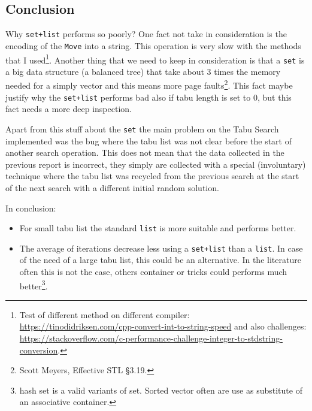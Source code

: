 \subsection{Conclusion}
	Why \verb|set+list| performs so poorly? One fact not take in consideration is the encoding of the \verb|Move| into a string. This operation is very slow with the methods that I used\footnote{Test of different method on different compiler: \\ \href{https://tinodidriksen.com/2010/02/cpp-convert-int-to-string-speed/}{https://tinodidriksen.com/cpp-convert-int-to-string-speed} and also challenges: \\ \href{https://stackoverflow.com/questions/4351371/c-performance-challenge-integer-to-stdstring-conversion}{https://stackoverflow.com/c-performance-challenge-integer-to-stdstring-conversion}.}. 
	Another thing that we need to keep in consideration is that a \verb|set| is a big data structure (a balanced tree) that take about 3 times the memory needed for a simply vector and this means more page faults\footnote{Scott Meyers, Effective STL §3.19.}. This fact maybe justify why the \verb|set+list| performs bad also if tabu length is set to 0, but this fact needs a more deep inspection.
	
	Apart from this stuff about the \verb|set| the main problem on the Tabu Search implemented was the bug where the tabu list was not clear before the start of another search operation. This does not mean that the data collected in the previous report is incorrect, they simply are collected with a special (involuntary) technique where the tabu list was recycled from the previous search at the start of the next search with a different initial random solution. 
	
	In conclusion:
	\begin{itemize}
		\item For small tabu list the standard \verb|list| is more suitable and performs better.
		\item The average of iterations decrease less using a \verb|set+list| than a \verb|list|. In case of the need of a large tabu list, this could be an alternative. In the literature often this is not the case, others container or tricks could performs much better\footnote{hash set is a valid variants of set. Sorted vector often are use as substitute of an associative container.}.
	\end{itemize}
	
